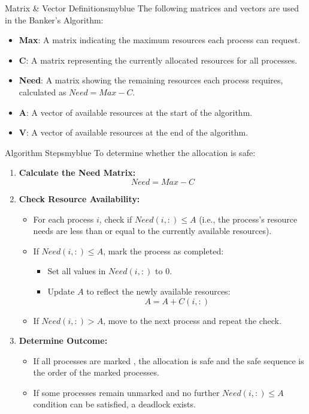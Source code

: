 \begin{prettyBox}{Matrix \& Vector Definitions}{myblue}
The following matrices and vectors are used in the Banker's Algorithm:
\begin{itemize}
    \item \textbf{Max}: A matrix indicating the maximum resources each process can request.
    \item \textbf{C}: A matrix representing the currently allocated resources for all processes.
    \item \textbf{Need}: A matrix showing the remaining resources each process requires, calculated as \(Need = Max - C\).
    \item \textbf{A}: A vector of available resources at the start of the algorithm.
    \item \textbf{V}: A vector of available resources at the end of the algorithm.
\end{itemize}
\end{prettyBox}

\vspace{0.25cm}

\begin{prettyBox}{Algorithm Steps}{myblue}
To determine whether the allocation is safe:
\begin{enumerate}
    \item \textbf{Calculate the Need Matrix:} 
        \[
        Need = Max - C
        \]
    \item \textbf{Check Resource Availability:}
    \begin{itemize}
        \item For each process \(i\), check if \(Need(i,:) \leq A\) (i.e., the process’s resource needs are less than or equal to the currently available resources).
        \item If \(Need(i,:) \leq A\), mark the process as completed:
        \begin{itemize}
            \item Set all values in \(Need(i,:)\) to \(0\).
            \item Update \(A\) to reflect the newly available resources:
            \[
            A = A + C(i,:)
            \]
        \end{itemize}
        \item If \(Need(i,:) > A\), move to the next process and repeat the check.
    \end{itemize}
    \item \textbf{Determine Outcome:}
    \begin{itemize}
        \item If all processes are marked , the allocation is safe and the safe sequence is the order of the marked processes.
        \item If some processes remain unmarked and no further \(Need(i,:) \leq A\) condition can be satisfied, a deadlock exists.
    \end{itemize}
\end{enumerate}
\end{prettyBox}

